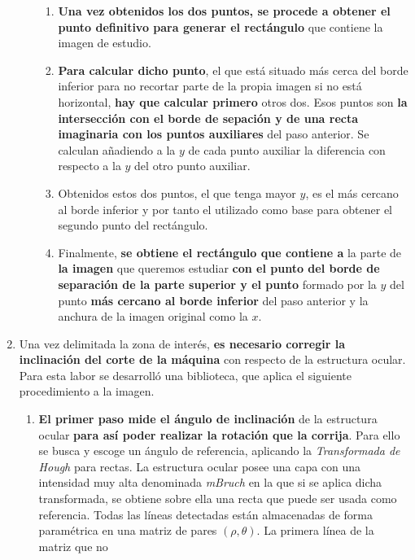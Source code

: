 \begin{enumerate}
\begin{enumerate}[label*=\arabic*.]
\begin{enumerate}[label*=\arabic*.]
    \item \textbf{Una vez obtenidos los dos puntos, se procede a
        obtener el punto definitivo para generar el rectángulo} que
      contiene la imagen de estudio.
    \item \textbf{Para calcular dicho punto}, el que está situado más
      cerca del borde inferior para no recortar parte de la propia
      imagen si no está horizontal, \textbf{hay que calcular primero}
      otros dos. Esos puntos son \textbf{la intersección con el borde
        de sepación y de una recta imaginaria con los puntos
        auxiliares} del paso anterior. Se calculan añadiendo a la $y$
      de cada punto auxiliar la diferencia con respecto a la $y$ del
      otro punto auxiliar.
    \item Obtenidos estos dos puntos, el que tenga mayor $y$, es el
      más cercano al borde inferior y por tanto el utilizado como base
      para obtener el segundo punto del rectángulo.
    \item Finalmente, \textbf{se obtiene el rectángulo que contiene a}
      la parte de \textbf{la imagen} que queremos estudiar \textbf{con
        el punto del borde de separación de la parte superior y el
        punto} formado por la $y$ del punto \textbf{más cercano al
        borde inferior} del paso anterior y la anchura de la imagen
      original como la $x$.
    \end{enumerate}
  \end{enumerate}
\item Una vez delimitada la zona de interés, \textbf{es necesario
    corregir la inclinación del corte de la máquina} con respecto de
  la estructura ocular. \\
  Para esta labor se desarrolló una biblioteca, que aplica el
  siguiente procedimiento a la imagen.
  \begin{enumerate}[label*=\arabic*.]
  \item \textbf{El primer paso mide el ángulo de inclinación} de la
    estructura ocular \textbf{para así poder realizar la rotación que
      la corrija}.  Para ello se busca y escoge un ángulo de
    referencia, aplicando la \emph{Transformada de
      Hough} para rectas. La estructura
    ocular posee una capa con una intensidad muy alta denominada
    \emph{\gls{mBruch}} en la que si se aplica dicha
    transformada, se obtiene sobre ella una recta que puede ser usada
    como referencia. Todas las líneas detectadas están almacenadas de
    forma paramétrica en una matriz de pares
    $\left(\rho, \theta \right)$. La primera línea de la matriz que no

\end{enumerate}
\end{enumerate}
